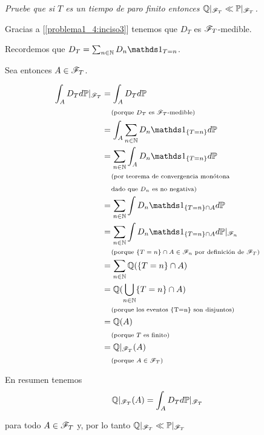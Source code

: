 \emph{
	Pruebe que si $T$ es un tiempo de paro finito 
	entonces $ \mathbb{Q} |_{\mathscr{F}_T}\ll \mathbb{P} |_{\mathscr{F}_T}$.
}

\afterstatement\pn

Gracias a [\ref{problema1_4:inciso3}] tenemos que $D_T$ es $\mathscr{F}_T$-medible.\pn

Recordemos que $D_T = \sum_{n \in \N} D_n \indic_{T = n}$.\pn

Sea entonces $A \in \mathscr{F}_T$.

\begin{align}
        \int_A D_T d\P|_{\F_T}  &=  \int_A D_T d\P                                                      \\
                                &\comment{porque $D_T$ es $\F_T$-medible}                               \\
                                &=  \int_A \sum_{n \in \N} D_n \indic_{\{T = n\}} d\P                   \\
                                &=  \sum_{n \in \N} \int_A D_n \indic_{\{T = n\}} d\P                   \\
                                &\lcomment{por teorema de convergencia monótona}                        \\
                                &\rcomment{dado que $D_n$ es no negativa}                               \\
                                &=  \sum_{n \in \N} \int D_n \indic_{\{T = n\} \cap A} d\P              \\
                                &=  \sum_{n \in \N} \int D_n \indic_{\{T = n\} \cap A} d\P|_{\F_n}      \\
                                &\comment{porque $\{T = n\} \cap A \in \F_n$ por definición de $\F_T$}  \\
                                &=  \sum_{n \in \N} \Q(\{T = n\} \cap A)                                \\                                
                                &=   \Q(\bigcup_{n \in \N} \{T = n\} \cap A)                            \\
                                &\comment{porque los eventos \{T=n\} son disjuntos}                     \\
                                &=   \Q(A)                                                              \\
                                &\comment{porque $T$ es finito}                                         \\
                                &=   \Q|_{\F_T}(A)                                                      \\
                                &\comment{porque $A \in \F_T$}
\end{align}

En resumen tenemos
\begin{align}
    \mathbb{Q}|_{\mathscr{F}_T}(A) = \int_A D_T d\mathbb{P}|_{\mathscr{F}_T}
\end{align}

para todo $A \in \mathscr{F}_T$ y, por lo tanto $\mathbb{Q}|_{\mathscr{F}_T} \ll \mathbb{P}|_{\mathscr{F}_T}$